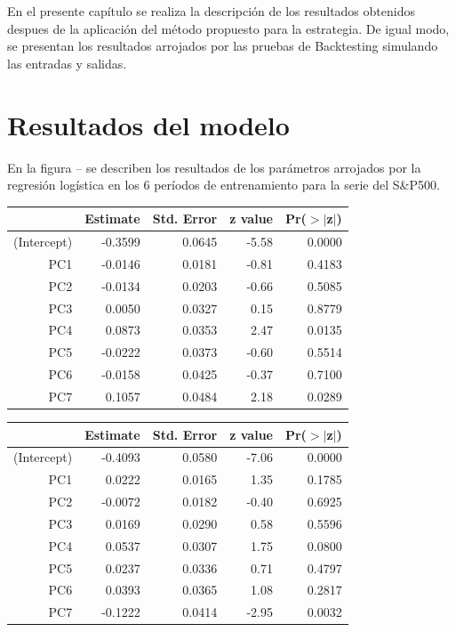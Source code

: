 \documentclass[a4paper,12pt]{Latex/Classes/PhDthesisPSnPDF}
\begin{document}
En el presente capítulo se realiza la descripción de los resultados obtenidos despues de la aplicación del método propuesto para la estrategia. De igual modo, se presentan los resultados arrojados por las pruebas de Backtesting simulando las entradas y salidas.

\section{Resultados del modelo}


En la figura -- se describen los resultados de los parámetros arrojados por la regresión logística en los 6 períodos de entrenamiento para la serie del S\&P500.

\begin{table}[ht]
\centering
\begin{tabular}{rrrrr}
  \hline
 & Estimate & Std. Error & z value & Pr($>$$|$z$|$) \\ 
  \hline
(Intercept) & -0.3599 & 0.0645 & -5.58 & 0.0000 \\ 
  PC1 & -0.0146 & 0.0181 & -0.81 & 0.4183 \\ 
  PC2 & -0.0134 & 0.0203 & -0.66 & 0.5085 \\ 
  PC3 & 0.0050 & 0.0327 & 0.15 & 0.8779 \\ 
  PC4 & 0.0873 & 0.0353 & 2.47 & 0.0135 \\ 
  PC5 & -0.0222 & 0.0373 & -0.60 & 0.5514 \\ 
  PC6 & -0.0158 & 0.0425 & -0.37 & 0.7100 \\ 
  PC7 & 0.1057 & 0.0484 & 2.18 & 0.0289 \\ 
   \hline
\end{tabular}
\end{table}
\begin{table}[ht]
\centering
\begin{tabular}{rrrrr}
  \hline
 & Estimate & Std. Error & z value & Pr($>$$|$z$|$) \\ 
  \hline
(Intercept) & -0.4093 & 0.0580 & -7.06 & 0.0000 \\ 
  PC1 & 0.0222 & 0.0165 & 1.35 & 0.1785 \\ 
  PC2 & -0.0072 & 0.0182 & -0.40 & 0.6925 \\ 
  PC3 & 0.0169 & 0.0290 & 0.58 & 0.5596 \\ 
  PC4 & 0.0537 & 0.0307 & 1.75 & 0.0800 \\ 
  PC5 & 0.0237 & 0.0336 & 0.71 & 0.4797 \\ 
  PC6 & 0.0393 & 0.0365 & 1.08 & 0.2817 \\ 
  PC7 & -0.1222 & 0.0414 & -2.95 & 0.0032 \\ 
   \hline
\end{tabular}
\end{table}
\end{document}

